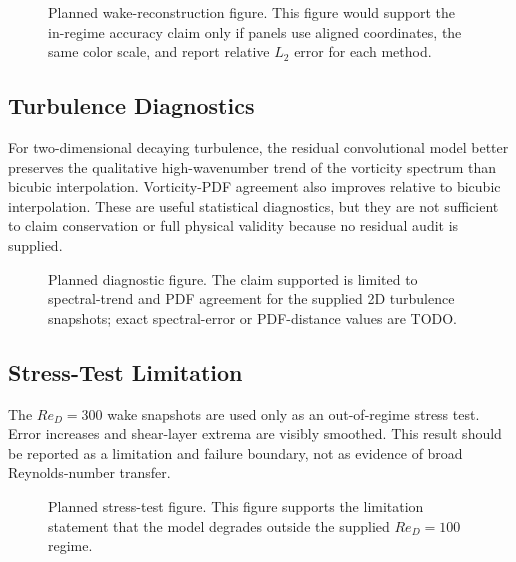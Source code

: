 \documentclass[11pt]{article}
\begin{document}
\begin{figure}[t]
\centering
{}
\caption{Planned wake-reconstruction figure. This figure would support the in-regime accuracy claim only if panels use aligned coordinates, the same color scale, and report relative $L_2$ error for each method.}
\end{figure}

\subsection{Turbulence Diagnostics}
For two-dimensional decaying turbulence, the residual convolutional model better preserves the qualitative high-wavenumber trend of the vorticity spectrum than bicubic interpolation. Vorticity-PDF agreement also improves relative to bicubic interpolation. These are useful statistical diagnostics, but they are not sufficient to claim conservation or full physical validity because no residual audit is supplied.

\begin{figure}[t]
\centering
{}
\caption{Planned diagnostic figure. The claim supported is limited to spectral-trend and PDF agreement for the supplied 2D turbulence snapshots; exact spectral-error or PDF-distance values are TODO.}
\end{figure}

\subsection{Stress-Test Limitation}
The $Re_D=300$ wake snapshots are used only as an out-of-regime stress test. Error increases and shear-layer extrema are visibly smoothed. This result should be reported as a limitation and failure boundary, not as evidence of broad Reynolds-number transfer.

\begin{figure}[t]
\centering
{}
\caption{Planned stress-test figure. This figure supports the limitation statement that the model degrades outside the supplied $Re_D=100$ regime.}
\end{figure}
\end{document}
